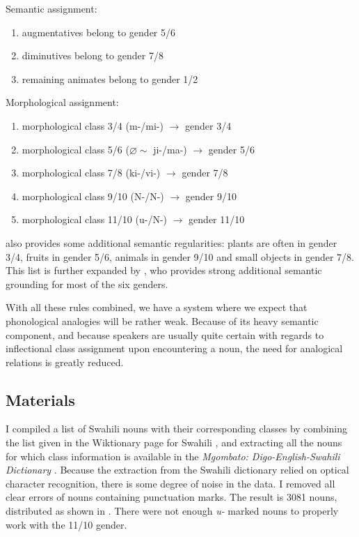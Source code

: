 \noindent
Semantic assignment:

\begin{enumerate}
  \item augmentatives belong to gender 5/6
  \item diminutives belong to gender 7/8
  \item remaining animates belong to gender 1/2
\end{enumerate}

\noindent
Morphological assignment:

\begin{enumerate}
  \item morphological class 3/4 (m-/mi-) $\rightarrow$ gender 3/4
  \item morphological class 5/6 ($\varnothing \sim$ ji-/ma-) $\rightarrow$ gender 5/6
  \item morphological class 7/8 (ki-/vi-) $\rightarrow$ gender 7/8
  \item morphological class 9/10 (N-/N-) $\rightarrow$ gender 9/10
  \item morphological class 11/10 (u-/N-) $\rightarrow$ gender 11/10
\end{enumerate}

\textcite[48]{Corbett.1991} also provides some additional semantic regularities: plants are often in gender 3/4, fruits in gender 5/6, animals in gender 9/10 and small objects in gender 7/8. This list is further expanded by \textcite{Contini-Morava.1994}, who provides strong additional semantic grounding for most of the six genders.

With all these rules combined, we have a system where we expect that phonological analogies will be rather weak. Because of its heavy semantic component, and because speakers are usually quite certain with regards to inflectional class assignment upon encountering a noun, the need for analogical relations is greatly reduced.

\subsection{Materials}

I compiled a list of Swahili nouns with their corresponding classes by combining the list given in the Wiktionary page for Swahili \autocite{WikimediaFundation.2016}, and extracting all the nouns for which class information is available in the \textit{Mgombato: Digo-English-Swahili Dictionary} \autocite{Mwalonya.2004}. Because the extraction from the Swahili dictionary relied on optical character recognition, there is some degree of noise in the data. I removed all clear errors of nouns containing punctuation marks. The result is 3081 nouns, distributed as shown in . There were not enough \textit{u-} marked nouns to properly work with the 11/10 gender.

